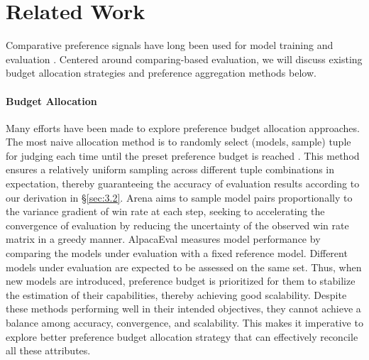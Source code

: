 \section{Related Work}
Comparative preference signals have long been used for model training \citep{insgpt,llama2} and evaluation \citep{arena,batcheval}.
Centered around comparing-based evaluation, we will discuss existing budget allocation strategies and preference aggregation methods below.
\paragraph{Budget Allocation}
\label{sec:2.1}
Many efforts have been made to explore preference budget allocation approaches.
The most naive allocation method is to randomly select (models, sample) tuple for judging each time until the preset preference budget is reached \citep{allpair}. 
This method ensures a relatively uniform sampling across different tuple combinations in expectation, thereby guaranteeing the accuracy of evaluation results according to our derivation in \S\ref{sec:3.2}.
Arena \citep{arena} aims to sample model pairs proportionally to the variance gradient of win rate at each step, seeking to accelerating the convergence of evaluation by reducing the uncertainty of the observed win rate matrix in a greedy manner. 
AlpacaEval \citep{alpacaeval} measures model performance by comparing the models under evaluation with a fixed reference model. Different models under evaluation are expected to be assessed on the same set. Thus, when new models are introduced, preference budget is prioritized for them to stabilize the estimation of their capabilities, thereby achieving good scalability.
Despite these methods performing well in their intended objectives, they cannot achieve a balance among accuracy, convergence, and scalability. This makes it imperative to explore better preference budget allocation strategy that can effectively reconcile all these attributes.
